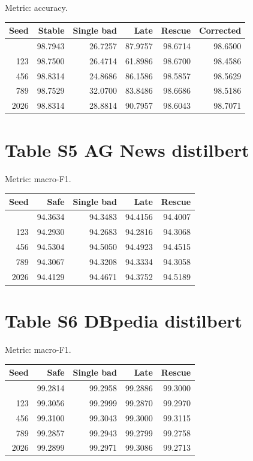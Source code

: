 \documentclass[11pt,a4paper]{article}
\begin{document}
Metric: accuracy.

\begin{longtable}[]{@{}rrrrrr@{}}
\toprule\noalign{}
Seed & Stable & Single bad & Late & Rescue & Corrected \\
\midrule\noalign{}
\endhead
\bottomrule\noalign{}
\endlastfoot
42 & 98.7943 & 26.7257 & 87.9757 & 98.6714 & 98.6500 \\
123 & 98.7500 & 26.4714 & 61.8986 & 98.6700 & 98.4586 \\
456 & 98.8314 & 24.8686 & 86.1586 & 98.5857 & 98.5629 \\
789 & 98.7529 & 32.0700 & 83.8486 & 98.6686 & 98.5186 \\
2026 & 98.8314 & 28.8814 & 90.7957 & 98.6043 & 98.7071 \\
\end{longtable}


\section{Table S5 AG News distilbert}\label{table-s5-ag-news-distilbert}

Metric: macro-F1.

\begin{longtable}[]{@{}rrrrr@{}}
\toprule\noalign{}
Seed & Safe & Single bad & Late & Rescue \\
\midrule\noalign{}
\endhead
\bottomrule\noalign{}
\endlastfoot
42 & 94.3634 & 94.3483 & 94.4156 & 94.4007 \\
123 & 94.2930 & 94.2683 & 94.2816 & 94.3068 \\
456 & 94.5304 & 94.5050 & 94.4923 & 94.4515 \\
789 & 94.3067 & 94.3208 & 94.3334 & 94.3058 \\
2026 & 94.4129 & 94.4671 & 94.3752 & 94.5189 \\
\end{longtable}


\section{Table S6 DBpedia distilbert}\label{table-s6-dbpedia-distilbert}

Metric: macro-F1.

\begin{longtable}[]{@{}rrrrr@{}}
\toprule\noalign{}
Seed & Safe & Single bad & Late & Rescue \\
\midrule\noalign{}
\endhead
\bottomrule\noalign{}
\endlastfoot
42 & 99.2814 & 99.2958 & 99.2886 & 99.3000 \\
123 & 99.3056 & 99.2999 & 99.2870 & 99.2970 \\
456 & 99.3100 & 99.3043 & 99.3000 & 99.3115 \\
789 & 99.2857 & 99.2943 & 99.2799 & 99.2758 \\
2026 & 99.2899 & 99.2971 & 99.3086 & 99.2713 \\
\end{longtable}
\end{document}
